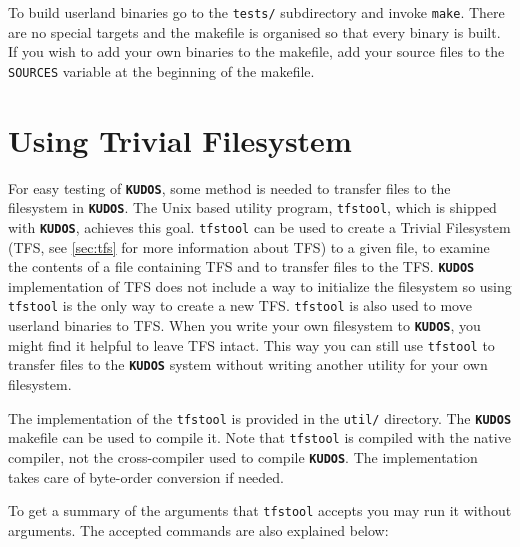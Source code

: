 \documentclass[twoside,a4paper]{report}
\newcommand{\kudos}{\texttt{\textbf{KUDOS}}}
\begin{document}

To build userland binaries go to the \texttt{tests/} subdirectory and
invoke \texttt{make}. There are no special targets and the makefile is
organised so that every binary is built. If you wish to add your own
binaries to the makefile, add your source files to the
\texttt{SOURCES} variable at the beginning of the makefile.


\section{Using Trivial Filesystem}
\label{sec:tfstool}


For easy testing of \kudos{}, some method is needed to transfer files
to the filesystem in \kudos{}. The Unix based utility program,
\texttt{tfstool}, which is shipped with \kudos{}, achieves this goal.
\texttt{tfstool} can be used to create a Trivial Filesystem (TFS, see
\autoref{sec:tfs} for more information about TFS) to a given file, to
examine the contents of a file containing TFS and to transfer files to
the TFS. \kudos{} implementation of TFS does not include a way to
initialize the filesystem so using \texttt{tfstool} is the only way to
create a new TFS. \texttt{tfstool} is also used to move userland
binaries to TFS. When you write your own filesystem to \kudos{}, you
might find it helpful to leave TFS intact. This way you can still use
\texttt{tfstool} to transfer files to the \kudos{} system without
writing another utility for your own filesystem.

The implementation of the \texttt{tfstool} is provided in the
\texttt{util/} directory. The \kudos{} makefile can be used to
compile it. Note that \texttt{tfstool} is compiled with the native compiler,
not the cross-compiler used to compile \kudos{}. The implementation
takes care of byte-order conversion if needed.

To get a summary of the arguments that \texttt{tfstool} accepts you
may run it without arguments. The accepted commands are also explained
below:
\end{document}
